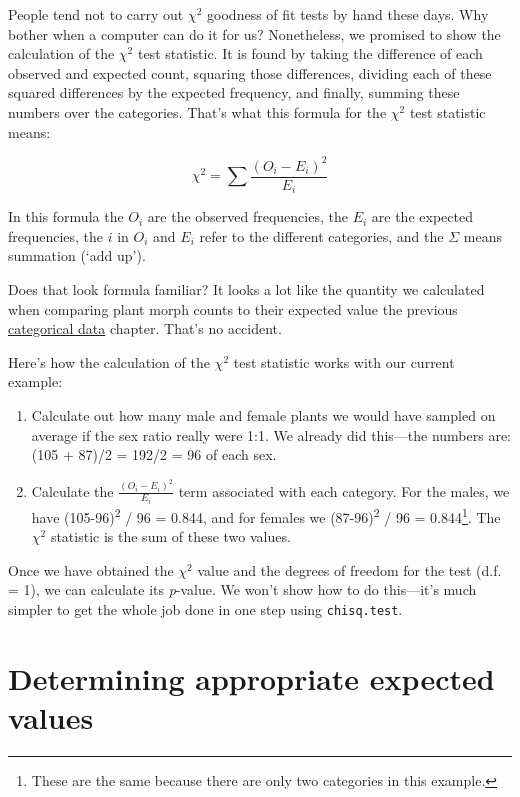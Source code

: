 \documentclass[
]{book}
\providecommand{\tightlist}{%
  \setlength{\itemsep}{0pt}\setlength{\parskip}{0pt}}
\begin{document}
People tend not to carry out \(\chi^{2}\) goodness of fit tests by hand these days. Why bother when a computer can do it for us? Nonetheless, we promised to show the calculation of the \(\chi^{2}\) test statistic. It is found by taking the difference of each observed and expected count, squaring those differences, dividing each of these squared differences by the expected frequency, and finally, summing these numbers over the categories. That's what this formula for the \(\chi^{2}\) test statistic means:

\[\chi^{2}=\sum\frac{(O_i-E_i)^{2}}{E_i}\]

In this formula the \(O_i\) are the observed frequencies, the \(E_i\) are the expected frequencies, the \(i\) in \(O_i\) and \(E_i\) refer to the different categories, and the \(\Sigma\) means summation (`add up').

Does that look formula familiar? It looks a lot like the quantity we calculated when comparing plant morph counts to their expected value the previous \protect\hyperlink{categorical-data-intro-chapter}{categorical data} chapter. That's no accident.

Here's how the calculation of the \(\chi^{2}\) test statistic works with our current example:

\begin{enumerate}
\def\labelenumi{\arabic{enumi}.}
\tightlist
\item
  Calculate out how many male and female plants we would have sampled on average if the sex ratio really were 1:1. We already did this---the numbers are: (105 + 87)/2 = 192/2 = 96 of each sex.
\item
  Calculate the \(\frac{(O_i-E_i)^2}{E_i}\) term associated with each category. For the males, we have (105-96)\textsuperscript{2} / 96 = 0.844, and for females we (87-96)\textsuperscript{2} / 96 = 0.844\footnote{These are the same because there are only two categories in this example.}. The \(\chi^{2}\) statistic is the sum of these two values.
\end{enumerate}

Once we have obtained the \(\chi^{2}\) value and the degrees of freedom for the test (d.f. = 1), we can calculate its \emph{p}-value. We won't show how to do this---it's much simpler to get the whole job done in one step using \texttt{chisq.test}.

\hypertarget{determining-appropriate-expected-values}{%
\section{Determining appropriate expected values}\label{determining-appropriate-expected-values}}
\end{document}
